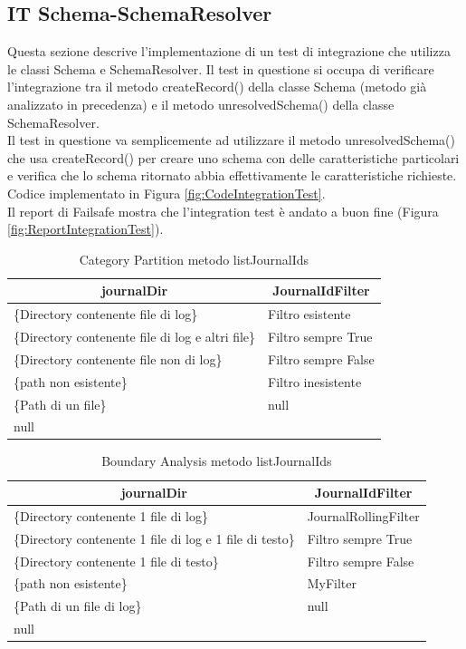 \documentclass[10pt, a4paper]{article}
\begin{document}
\subsection{IT Schema-SchemaResolver}
Questa sezione descrive l'implementazione di un test di integrazione che utilizza le classi Schema e SchemaResolver.
Il test in questione si occupa di verificare l'integrazione tra il metodo createRecord() della classe Schema (metodo già
analizzato in precedenza) e il metodo unresolvedSchema() della classe SchemaResolver. \\
Il test in questione va semplicemente ad utilizzare il metodo unresolvedSchema() che usa createRecord() per creare uno schema
con delle caratteristiche particolari e verifica che lo schema ritornato abbia effettivamente le caratteristiche richieste. \\
Codice implementato in Figura \ref{fig:CodeIntegrationTest}. \\
Il report di Failsafe mostra che l'integration test è andato a buon fine (Figura \ref{fig:ReportIntegrationTest}).
\newpage

\begin{table}[ht]
  \centering
  \caption[Journal: Category Partition]{Category Partition metodo listJournalIds}
  \begin{tabular}{|l|l|}
  \hline
  \multicolumn{1}{|c|}{journalDir} & \multicolumn{1}{|c|}{JournalIdFilter} \\
  \hline
  \{Directory contenente file di log\} & Filtro esistente \\
  \{Directory contenente file di log e altri file\} & Filtro sempre True \\
  \{Directory contenente file non di log\} & Filtro sempre False \\
  \{path non esistente\} & Filtro inesistente \\
  \{Path di un file\} & null \\
  null & \\
  \hline
  \end{tabular}
  \label{tab:categoryPartitionListJournalIds}
\end{table}

\begin{table}[ht]
  \centering
  \caption[Journal: Boundary Analysis]{Boundary Analysis metodo listJournalIds}
  \begin{tabular}{|l|l|}
  \hline
  \multicolumn{1}{|c|}{journalDir} & \multicolumn{1}{|c|}{JournalIdFilter} \\
  \hline
  \{Directory contenente 1 file di log\} & JournalRollingFilter \\
  \{Directory contenente 1 file di log e 1 file di testo\} & Filtro sempre True \\
  \{Directory contenente 1 file di testo\} & Filtro sempre False \\
  \{path non esistente\} & MyFilter \\
  \{Path di un file di log\} & null \\
  null & \\
  \hline
  \end{tabular}
  \label{tab:boundaryAnalyisListJournalIds}
\end{table}
\end{document}
